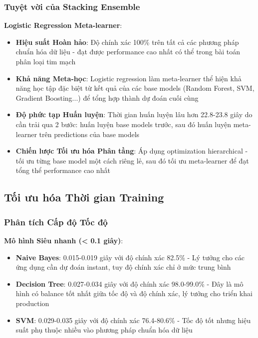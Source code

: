 \subsubsection{Tuyệt vời của Stacking Ensemble}

\textbf{Logistic Regression Meta-learner}:
\begin{itemize}
    \item \textbf{Hiệu suất Hoàn hảo}: Độ chính xác 100\% trên tất cả các phương pháp chuẩn hóa dữ liệu - đạt được performance cao nhất có thể trong bài toán phân loại tim mạch
    \item \textbf{Khả năng Meta-học}: Logistic regression làm meta-learner thể hiện khả năng học tập đặc biệt từ kết quả của các base models (Random Forest, SVM, Gradient Boosting...) để tổng hợp thành dự đoán cuối cùng  
    \item \textbf{Độ phức tạp Huấn luyện}: Thời gian huấn luyện lâu hơn 22.8-23.8 giây do cần trải qua 2 bước: huấn luyện base models trước, sau đó huấn luyện meta-learner trên predictions của base models
    \item \textbf{Chiến lược Tối ưu hóa Phân tầng}: Áp dụng optimization hierarchical - tối ưu từng base model một cách riêng lẻ, sau đó tối ưu meta-learner để đạt tổng thể performance cao nhất
\end{itemize}

\subsection{Tối ưu hóa Thời gian Training}\label{subsec:training-optimization}

\subsubsection{Phân tích Cấp độ Tốc độ}

\textbf{Mô hình Siêu nhanh (< 0.1 giây)}:
\begin{itemize}
    \item \textbf{Naive Bayes}: 0.015-0.019 giây với độ chính xác 82.5\% - Lý tưởng cho các ứng dụng cần dự đoán instant, tuy độ chính xác chỉ ở mức trung bình
    \item \textbf{Decision Tree}: 0.027-0.034 giây với độ chính xác 98.0-99.0\% - Đây là mô hình có balance tốt nhất giữa tốc độ và độ chính xác, lý tưởng cho triển khai production
    \item \textbf{SVM}: 0.029-0.035 giây với độ chính xác 76.4-80.6\% - Tốc độ tốt nhưng hiệu suất phụ thuộc nhiều vào phương pháp chuẩn hóa dữ liệu
\end{itemize}

